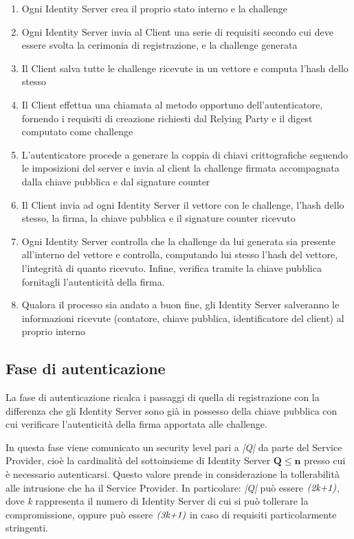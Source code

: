 \begin{enumerate}
	\item Ogni Identity Server crea il proprio stato interno e la challenge
	\item Ogni Identity Server invia al Client una serie di requisiti secondo cui deve essere svolta la cerimonia di registrazione, e la challenge generata
	\item Il Client salva tutte le challenge ricevute in un vettore e computa l'hash dello stesso
	\item Il Client effettua una chiamata al metodo opportuno dell'autenticatore, fornendo i requisiti di creazione richiesti dal Relying Party e il digest computato come challenge
	\item L'autenticatore procede a generare la coppia di chiavi crittografiche seguendo le imposizioni del server e invia al client la challenge firmata accompagnata dalla chiave pubblica e dal signature counter
	\item Il Client invia ad ogni Identity Server il vettore con le challenge, l'hash dello stesso, la firma, la chiave pubblica e il signature counter ricevuto
	\item Ogni Identity Server controlla che la challenge da lui generata sia presente all'interno del vettore e controlla, computando lui stesso l'hash del vettore, l'integrità di quanto ricevuto. Infine, verifica tramite la chiave pubblica fornitagli l'autenticità della firma.
	\item Qualora il processo sia andato a buon fine, gli Identity Server salveranno le informazioni ricevute (contatore, chiave pubblica, identificatore del client) al proprio interno
\end{enumerate} 

\subsection{Fase di autenticazione}
\label{autenticazione}

La fase di autenticazione ricalca i passaggi di quella di registrazione con la differenza che gli Identity Server sono già in possesso della chiave pubblica con cui verificare l'autenticità della firma apportata alle challenge. 

In questa fase viene comunicato un security level pari a \emph{|Q|} da parte del Service Provider, cioè la cardinalità del sottoinsieme di Identity Server $\mathbf{Q\leq n}$ presso cui è necessario autenticarsi. Questo valore prende in considerazione la tollerabilità alle intrusione che ha il Service Provider. In particolare: \emph{|Q|} può essere $ \emph{(2k+1)} $, dove \emph{k} rappresenta il numero di Identity Server di cui si può tollerare la compromissione, oppure può essere $ \emph{(3k+1)} $ in caso di requisiti particolarmente stringenti. 

